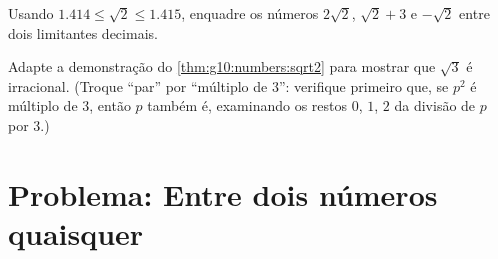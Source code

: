 \begin{exercise}[$\star\star$]\label{exo:g10:numbers:9}
Usando $1.414 \leq \sqrt 2 \leq 1.415$, enquadre os números $2\sqrt2$,
$\sqrt2 + 3$ e $-\sqrt2$ entre dois limitantes decimais.
\end{exercise}

\begin{exercise}[$\star\star\star$]\label{exo:g10:numbers:10}
Adapte a demonstração do \cref{thm:g10:numbers:sqrt2} para mostrar que
$\sqrt 3$ é irracional. (Troque ``par'' por ``múltiplo de $3$'': verifique
primeiro que, se $p^2$ é múltiplo de $3$, então $p$ também é, examinando
os restos $0$, $1$, $2$ da divisão de $p$ por $3$.)
\end{exercise}

\section{Problema: Entre dois números quaisquer}


